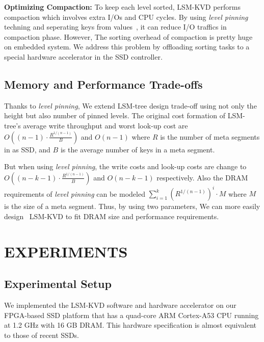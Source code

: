 \documentclass{abstract_hutech}
\newcommand{\ours}{LSM-KVD}
\begin{document}
\textbf{Optimizing Compaction:}
To keep each level sorted, \ours{} performs compaction which involves extra I/Os and CPU cycles.
By using \textit{level pinning} techning and seperating keys from values{~\cite{wisckey}}, it can reduce I/O traffics in compaction phase. 
However, The sorting overhead of compaction is pretty huge on embedded system. 
We address this problem by offloading sorting tasks to a special hardware accelerator in the SSD controller.

\vspace{-5pt}
\subsection{Memory and Performance Trade-offs}\vspace{-5pt}
Thanks to \textit{level pinning}, We extend LSM-tree design trade-off using not only the height but also number of pinned levels. 
The original cost formation of LSM-tree's average write throughput and worst look-up cost are 
$O((n-1)\cdot\frac{R^{1/(n-1)}}{B})$ and $O(n-1)$ 
where $R$ is the number of meta segments in as SSD, and $B$ is the average number of keys in a meta segment.

But when using \textit{level pinning}, 
the write costs and look-up costs are change to $O((n-k-1)\cdot\frac{R^{1/(n-1)}}{B})$ and $O(n-k-1)$ respectively.
Also the DRAM requirements of \textit{level pinning} can be modeled $\sum_{i=1}^{k}(R^{1/(n-1)})^i\cdot M$ where $M$ is the size of a meta segment.
Thus, by using two parameters, We can more easily design ~\ours{} to fit DRAM size and performance requirements.

\vspace{-5pt}
\section{EXPERIMENTS}\vspace{-5pt}
\subsection{Experimental Setup}\vspace{-5pt}
We implemented the \ours{} software and hardware accelerator on our FPGA-based
SSD platform that has a quad-core ARM Cortex-A53 CPU running at 1.2 GHz with 16 GB
DRAM. This hardware specification is almost equivalent to those of recent SSDs.
\end{document}
